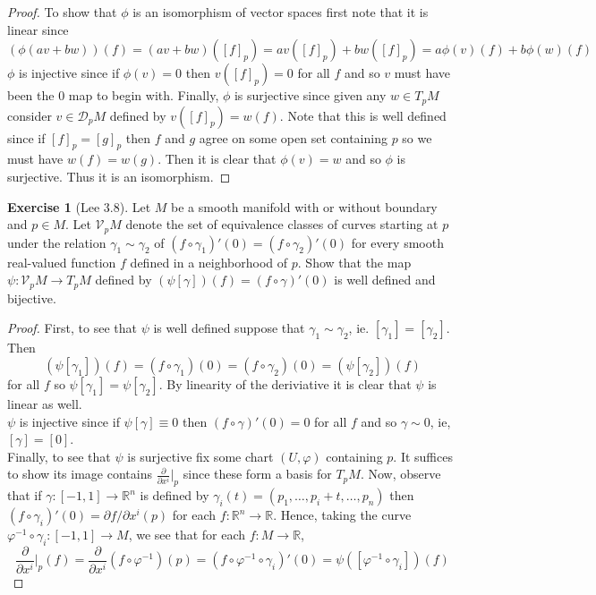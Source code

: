 \documentclass{article}
\newcommand{\bR}{\mathbb{R}}
\newcommand{\vp}{\varphi}
\newcommand{\cD}{\mathcal{D}}
\newcommand{\cV}{\mathcal{V}}
\theoremstyle{definition}
\newtheorem{exercise}{Exercise}
\begin{document}
\begin{proof}
    To show that $\phi$ is an isomorphism of vector spaces first note that it is linear since 
    \[(\phi(av+bw))(f) = (av+bw)([f]_p) = av([f]_p) + bw([f]_p) = a \phi(v)(f) + b\phi(w)(f) \] 
    $\phi$ is injective since if $\phi(v)=0$ then $v([f]_p)=0$ for all $f$ and so $v$ must have been the 0 map to begin with. Finally, $\phi$ is surjective since given any $w \in T_pM$ consider $v \in \cD_pM$ defined by $v([f]_p)=w(f)$. Note that this is well defined since if $[f]_p = [g]_p$ then $f$ and $g$ agree on some open set containing $p$ so we must have $w(f) = w(g)$. Then it is clear that $\phi(v)=w$ and so $\phi$ is surjective. Thus it is an isomorphism. 
\end{proof}

\begin{exercise}[Lee 3.8]
    Let $M$ be a smooth manifold with or without boundary and $p \in M$. Let $\cV_p M$ denote the set of equivalence classes of curves starting at $p$ under the relation $\gamma_1 \sim \gamma_2$ of $(f \circ \gamma_1)'(0) = (f \circ \gamma_2)'(0)$ for every smooth real-valued function $f$ defined in a neighborhood of $p$. Show that the map $\psi: \cV_pM \to T_pM$ defined by $(\psi[\gamma])(f) = (f \circ \gamma)'(0)$ is well defined and bijective.  
\end{exercise}

\begin{proof}
    First, to see that $\psi$ is well defined suppose that $\gamma_1 \sim \gamma_2$, ie. $[\gamma_1] = [\gamma_2]$. Then 
    \[ (\psi[\gamma_1])(f) = (f \circ \gamma_1)(0) = (f \circ \gamma_2)(0) = (\psi[\gamma_2])(f) \] 
    for all $f$ so $\psi[\gamma_1] = \psi[\gamma_2]$. By linearity of the deriviative it is clear that $\psi$ is linear as well. \\ 
$\psi$ is injective since if $\psi[\gamma] \equiv 0$ then $(f \circ \gamma)'(0)=0$ for all $f$ and so $\gamma \sim 0$, ie, $[\gamma]= [0]$. \\ 
Finally, to see that $\psi$ is surjective fix some chart $(U, \vp)$ containing $p$. It suffices to show its image contains $\frac{\partial}{\partial x^i}|_p$ since these form a basis for $T_pM$. Now, observe that if $\gamma: [-1,1] \to \bR^n$ is defined by $\gamma_i(t) = (p_1, \ldots, p_i+t, \ldots, p_n)$ then $(f \circ \gamma_i)'(0) = \partial f/\partial x^i (p)$ for each $f: \bR^n \to \bR$. Hence, taking the curve $\vp^{-1} \circ \gamma_i: [-1,1] \to M$, we see that for each $f: M \to \bR$, 
\[ \frac{\partial}{\partial x^i}|_p(f) = \frac{\partial}{\partial x^i}(f \circ \vp^{-1})(p)  = (f \circ \vp^{-1} \circ \gamma_i)'(0) = \psi([\vp^{-1} \circ \gamma_i])(f)  \]
\end{proof}
\end{document}
